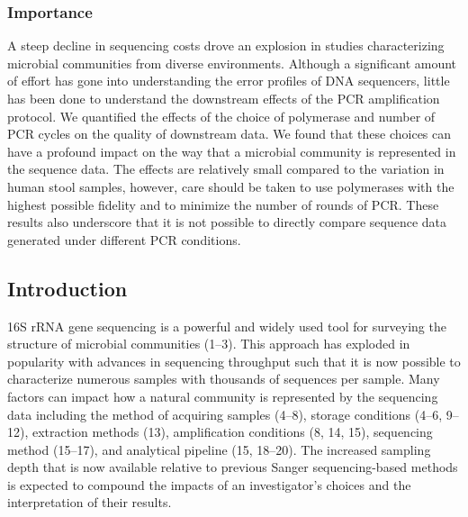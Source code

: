 \documentclass[11pt,]{article}
\begin{document}
\hypertarget{importance}{%
\subsubsection{Importance}\label{importance}}

A steep decline in sequencing costs drove an explosion in studies
characterizing microbial communities from diverse environments. Although
a significant amount of effort has gone into understanding the error
profiles of DNA sequencers, little has been done to understand the
downstream effects of the PCR amplification protocol. We quantified the
effects of the choice of polymerase and number of PCR cycles on the
quality of downstream data. We found that these choices can have a
profound impact on the way that a microbial community is represented in
the sequence data. The effects are relatively small compared to the
variation in human stool samples, however, care should be taken to use
polymerases with the highest possible fidelity and to minimize the
number of rounds of PCR. These results also underscore that it is not
possible to directly compare sequence data generated under different PCR
conditions.

\newpage

\hypertarget{introduction}{%
\subsection{Introduction}\label{introduction}}

16S rRNA gene sequencing is a powerful and widely used tool for
surveying the structure of microbial communities (1--3). This approach
has exploded in popularity with advances in sequencing throughput such
that it is now possible to characterize numerous samples with thousands
of sequences per sample. Many factors can impact how a natural community
is represented by the sequencing data including the method of acquiring
samples (4--8), storage conditions (4--6, 9--12), extraction methods
(13), amplification conditions (8, 14, 15), sequencing method (15--17),
and analytical pipeline (15, 18--20). The increased sampling depth that
is now available relative to previous Sanger sequencing-based methods is
expected to compound the impacts of an investigator's choices and the
interpretation of their results.
\end{document}
